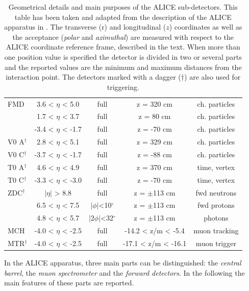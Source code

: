 \begin{table}[!tp]
\begin{tabular*}{\textwidth}{@{\extracolsep{\fill}}lcccc}
    FMD 	                 & 3.6 < $\eta$ < 5.0   & full			& z = 320 cm		& ch. particles\\
			                 & 1.7 < $\eta$ < 3.7	& full			& z = 80 cm		    & ch. particles\\
			                 & -3.4 < $\eta$ < -1.7 & full			& z = -70 cm		& ch. particles\\
	V0 A$^{\dagger}$         & 2.8 < $\eta$ < 5.1	& full			& z = 329 cm		& ch. particles\\
	V0 C$^{\dagger}$         & -3.7 < $\eta$ < -1.7	& full			& z = -88 cm		& ch. particles\\
	T0 A$^{\dagger}$         & 4.6 < $\eta$ < 4.9	& full			& z = 370 cm		& time, vertex\\
	T0 C$^{\dagger}$         & -3.3 < $\eta$ < -3.0	& full			& z = -70 cm		& time, vertex\\
	ZDC$^{\dagger}$		     & $|\eta|$ > 8.8	    & full			& z = $\pm$113 cm	& fwd neutrons\\
			                 & 6.5 < $\eta$ < 7.5	& $|\phi|$<10$^{\circ}$             & z = $\pm$113 cm	&fwd protons\\
			                 & 4.8 < $\eta$ < 5.7	& $|2\phi|$<32$^{\circ}$            & z = $\pm$113 cm   &photons\\
    \midrule
	MCH	                     & -4.0 < $\eta$ < -2.5 & full & -14.2 < z/m < -5.4  & muon tracking \\
	MTR$^{\dagger}$	         & -4.0 < $\eta$ < -2.5 & full & -17.1 < z/m < -16.1 & muon trigger \\	
    \bottomrule
    \end{tabular*}
    \vspace{2pt}
	\caption{Geometrical details and main purposes of the ALICE sub-detectors. This table has been taken and adapted from the description of the ALICE apparatus in \cite{alice:Perf2014}. The transverse (r) and longitudinal ($z$) coordinates as well as the acceptance (\textit{polar} and \textit{azimuthal}) are measured with respect to the ALICE coordinate reference frame, described in the text. When more than one position value is specified the detector is divided in two or several parts and the reported values are the minimum and maximum distances from the interaction point. The detectors marked with a dagger ($\dagger$) are also used for triggering.}
	\label{tab:alice}
\end{table}
\endgroup

In the ALICE apparatus, three main parts can be distinguished: the \textit{central barrel}, the
\textit{muon spectrometer} and the \textit{forward detectors}.
In the following the main features of these parts are reported.
